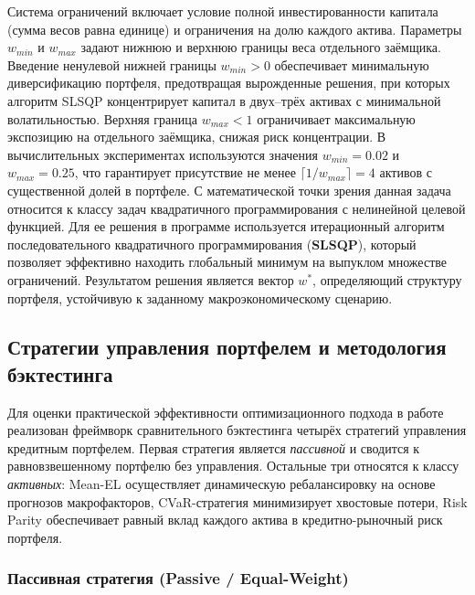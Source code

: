 \documentclass[]{article}
\begin{document}
	Система ограничений включает условие полной инвестированности капитала (сумма весов равна единице)
	и ограничения на долю каждого актива. Параметры $w_{min}$ и $w_{max}$ задают нижнюю и верхнюю
	границы веса отдельного заёмщика. Введение ненулевой нижней границы $w_{min} > 0$ обеспечивает
	минимальную диверсификацию портфеля, предотвращая вырожденные решения, при которых алгоритм SLSQP
	концентрирует капитал в двух--трёх активах с минимальной волатильностью. Верхняя граница $w_{max} < 1$
	ограничивает максимальную экспозицию на отдельного заёмщика, снижая риск концентрации.
	В вычислительных экспериментах используются значения $w_{min} = 0.02$ и $w_{max} = 0.25$, что
	гарантирует присутствие не менее $\lceil 1 / w_{max} \rceil = 4$ активов с существенной долей
	в портфеле. С математической точки зрения данная задача
	относится к классу задач квадратичного программирования с нелинейной целевой функцией. Для ее решения
	в программе используется итерационный алгоритм последовательного квадратичного
	программирования (\textbf{SLSQP}), который позволяет эффективно находить глобальный минимум на
	выпуклом множестве ограничений. Результатом решения является вектор $w^*$, определяющий структуру
	портфеля, устойчивую к заданному макроэкономическому сценарию.

	\subsection{Стратегии управления портфелем и методология бэктестинга}

	Для оценки практической эффективности оптимизационного подхода в работе реализован фреймворк
	сравнительного бэктестинга четырёх стратегий управления кредитным портфелем. Первая стратегия
	является \emph{пассивной} и сводится к равновзвешенному портфелю без управления. Остальные три
	относятся к классу \emph{активных}: Mean-EL осуществляет динамическую ребалансировку на основе
	прогнозов макрофакторов, CVaR-стратегия минимизирует хвостовые потери, Risk Parity обеспечивает
	равный вклад каждого актива в кредитно-рыночный риск портфеля.

	\subsubsection{Пассивная стратегия (Passive / Equal-Weight)}
\end{document}
